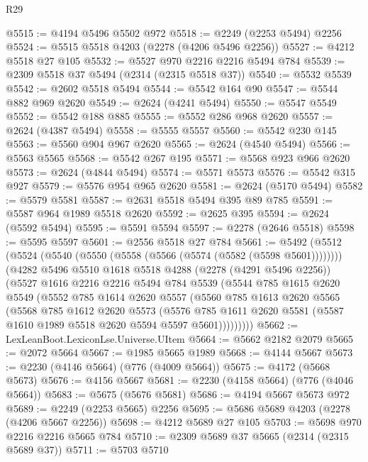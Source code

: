 \begin{lexlean}{R29}
\begin{coremodule}
@5515 := @4194 @5496 @5502 @972
@5518 := @2249 (@2253 @5494) @2256
@5524 := @5515 @5518 @4203 (@2278 (@4206 @5496 @2256))
@5527 := @4212 @5518 @27 @105
@5532 := @5527 @970 @2216 @2216 @5494 @784
@5539 := @2309 @5518 @37 @5494 (@2314 (@2315 @5518 @37))
@5540 := @5532 @5539
@5542 := @2602 @5518 @5494
@5544 := @5542 @164 @90
@5547 := @5544 @882 @969 @2620
@5549 := @2624 (@4241 @5494)
@5550 := @5547 @5549
@5552 := @5542 @188 @885
@5555 := @5552 @286 @968 @2620
@5557 := @2624 (@4387 @5494)
@5558 := @5555 @5557
@5560 := @5542 @230 @145
@5563 := @5560 @904 @967 @2620
@5565 := @2624 (@4540 @5494)
@5566 := @5563 @5565
@5568 := @5542 @267 @195
@5571 := @5568 @923 @966 @2620
@5573 := @2624 (@4844 @5494)
@5574 := @5571 @5573
@5576 := @5542 @315 @927
@5579 := @5576 @954 @965 @2620
@5581 := @2624 (@5170 @5494)
@5582 := @5579 @5581
@5587 := @2631 @5518 @5494 @395 @89 @785
@5591 := @5587 @964 @1989 @5518 @2620
@5592 := @2625 @395
@5594 := @2624 (@5592 @5494)
@5595 := @5591 @5594
@5597 := @2278 (@2646 @5518)
@5598 := @5595 @5597
@5601 := @2556 @5518 @27 @784
@5661 := @5492
    (@5512
      (@5524 (@5540 (@5550 (@5558 (@5566 (@5574 (@5582 (@5598 @5601))))))))
      (@4282
        @5496
        @5510
        @1618
        @5518
        @4288
        (@2278 (@4291 @5496 @2256))
        (@5527
          @1616
          @2216
          @2216
          @5494
          @784
          @5539
          (@5544
            @785
            @1615
            @2620
            @5549
            (@5552
              @785
              @1614
              @2620
              @5557
              (@5560
                @785
                @1613
                @2620
                @5565
                (@5568
                  @785
                  @1612
                  @2620
                  @5573
                  (@5576
                    @785
                    @1611
                    @2620
                    @5581
                    (@5587 @1610 @1989 @5518 @2620 @5594 @5597 @5601)))))))))
@5662 := LexLeanBoot.LexiconLse.Universe.UItem
@5664 := @5662 @2182 @2079
@5665 := @2072 @5664
@5667 := @1985 @5665 @1989
@5668 := @4144 @5667
@5673 := @2230 (@4146 @5664) (@776 (@4009 @5664))
@5675 := @4172 (@5668 @5673)
@5676 := @4156 @5667
@5681 := @2230 (@4158 @5664) (@776 (@4046 @5664))
@5683 := @5675 (@5676 @5681)
@5686 := @4194 @5667 @5673 @972
@5689 := @2249 (@2253 @5665) @2256
@5695 := @5686 @5689 @4203 (@2278 (@4206 @5667 @2256))
@5698 := @4212 @5689 @27 @105
@5703 := @5698 @970 @2216 @2216 @5665 @784
@5710 := @2309 @5689 @37 @5665 (@2314 (@2315 @5689 @37))
@5711 := @5703 @5710

\end{coremodule}
\end{lexlean}
